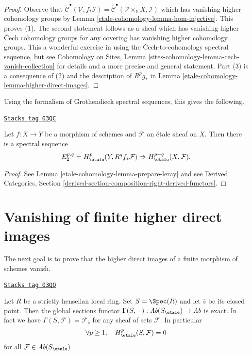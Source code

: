 \begin{proof}
Observe that $\check{\mathcal{C}}^\bullet(\mathcal{V}, f_*\mathcal{I}) =
\check{\mathcal{C}}^\bullet(\mathcal{V} \times_Y X, \mathcal{I})$
which has vanishing higher cohomology groups by Lemma \ref{etale-cohomology-lemma-hom-injective}.
This proves (1). The second statement follows as a sheaf which has
vanishing higher {\v C}ech cohomology groups for any covering has vanishing
higher cohomology groups. This a wonderful exercise in using the
{\v C}ech-to-cohomology spectral sequence, but see
Cohomology on Sites, Lemma \ref{sites-cohomology-lemma-cech-vanish-collection}
for details and a more precise and general statement.
Part (3) is a consequence of (2) and the description of
$R^pg_*$ in Lemma \ref{etale-cohomology-lemma-higher-direct-images}.
\end{proof}

Using the formalism of Grothendieck spectral sequences, this gives the
following.

\begin{proposition}

\label{etale-cohomology-proposition-leray}
\href{https://stacks.math.columbia.edu/tag/03QC}{\texttt{Stacks tag 03QC}}

Let $f: X \to Y$ be a morphism of schemes and $\mathcal{F}$ an \'etale sheaf on
$X$. Then there is a spectral sequence
$$
E_2^{p, q} = H_\etale^p(Y, R^qf_*\mathcal{F}) \Rightarrow
H_\etale^{p+q}(X, \mathcal{F}).
$$
\end{proposition}

\begin{proof}
See Lemma \ref{etale-cohomology-lemma-prepare-leray} and see
Derived Categories, Section
\ref{derived-section-composition-right-derived-functors}.
\end{proof}

\section{Vanishing of finite higher direct images}
\label{etale-cohomology-section-vanishing-finite-morphism}
The next goal is to prove that the higher direct images of a finite morphism of
schemes vanish.

\begin{lemma}
\label{etale-cohomology-lemma-vanishing-etale-cohomology-strictly-henselian}
\href{https://stacks.math.columbia.edu/tag/03QO}{\texttt{Stacks tag 03QO}}

Let $R$ be a strictly henselian local ring. Set $S = \Spec(R)$ and let
$\overline{s}$ be its closed point. Then the global
sections functor
$\Gamma(S, -) : \textit{Ab}(S_\etale) \to \textit{Ab}$
is exact. In fact we have $\Gamma(S, \mathcal{F}) = \mathcal{F}_{\overline{s}}$
for any sheaf of sets $\mathcal{F}$. In particular
$$
\forall p\geq 1, \quad H_\etale^p(S, \mathcal{F})=0
$$
for all $\mathcal{F}\in \textit{Ab}(S_\etale)$.
\end{lemma}

